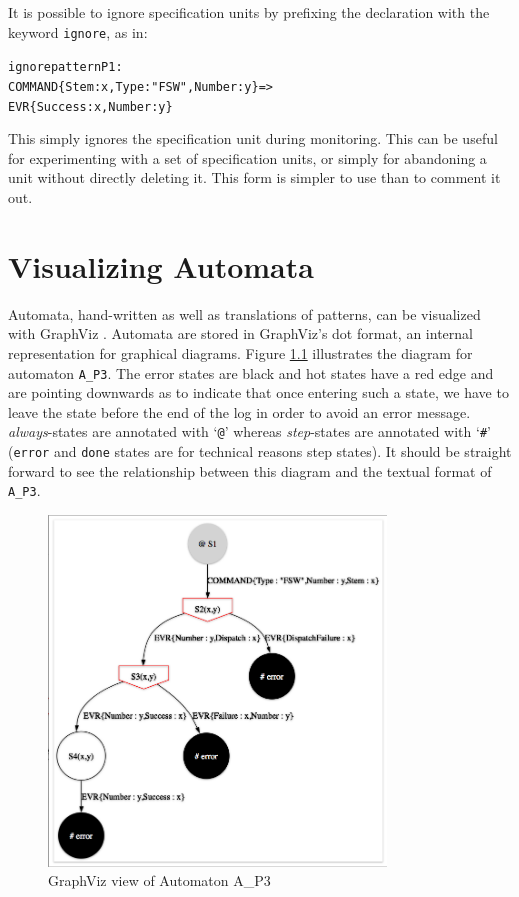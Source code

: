 \documentclass{report}
\newenvironment{code}[1] %
{
\vspace{0.5cm}
\begin{center}
\begin{Sbox}
\begin{minipage}{11cm}
\begin{alltt}
{\bf\em #1}
}
{
\end{alltt}
\end{minipage}
\end{Sbox}
\setlength{\fboxsep}{8pt}
\fbox{\TheSbox}
\end{center}
\vspace{0.5cm}
}
\begin{document}
\noindent It is possible to ignore specification units by prefixing the declaration
with the keyword {\tt ignore}, as in:

\begin{code}{}
  ignore pattern P1:  
    COMMAND\{Stem: x, Type : "FSW", Number: y\} => 
      EVR\{Success: x, Number: y\}  
\end{code}

\noindent This simply ignores the specification unit during monitoring. This can be useful
for experimenting with a set of specification units, or simply for abandoning a unit without
directly deleting it. This form is simpler to use than to comment it out.


\chapter{Visualizing Automata}

Automata, hand-written as well as translations of patterns, can be visualized with GraphViz \cite{graphviz}.
Automata are stored in GraphViz's dot format, an internal representation for graphical diagrams. Figure
\ref{fig:vizA_P3} illustrates the diagram for automaton {\tt A\_P3}. The error states are black and hot states have a 
red edge and are pointing downwards as to indicate that once entering such a state, we have to leave the state before the
end of the log in order to avoid an error message. 
{\em always}-states are annotated with `{\tt @}' whereas {\em step}-states are annotated with `{\tt \#}' ({\tt error} and
{\tt done} states are for technical reasons step states).
It should be straight forward to see the relationship between
this diagram and the textual format of {\tt A\_P3}.

\begin{figure}
\begin{center}
\includegraphics[width=0.8\textwidth]{graphics/A_P3}
\caption{GraphViz view of Automaton A\_P3}
\label{fig:vizA_P3}
\end{center}
\end{figure}
\end{document}
